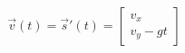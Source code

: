 \documentclass[preview]{standalone}
\begin{document}
\begin{align*}
\vec{v}(t) = \vec{s} '(t) = \begin{bmatrix} v_x \\ v_y - gt \end{bmatrix}
\end{align*}
\end{document}

